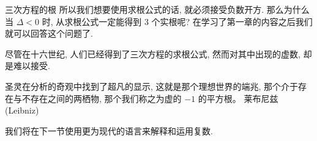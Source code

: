 \begin{frame}{三次方程的根\noexer}
	\onslide<+->
	所以我们想要使用求根公式的话, 就\alert{必须接受负数开方}.
	\onslide<+->
	那么为什么当 $\Delta<0$ 时, 从求根公式一定能得到 $3$ 个实根呢?
	\onslide<+->
	在学习了第一章的内容之后我们就可以回答这个问题了.

	\onslide<+->
	尽管在十六世纪, 人们已经得到了三次方程的求根公式, 然而对其中出现的虚数, 却是难以接受.

	\onslide<+->
	\begin{tcolorbox}[
		common,
		borderline={0pt}{0pt}{fourth,cstdash},
		colbacktitle=fourth,
		fontlower=\itshape,
		halign lower=flush right,
		lower separated=true]
		圣灵在分析的奇观中找到了超凡的显示, 这就是那个理想世界的端兆, 那个介于存在与不存在之间的两栖物, 那个我们称之为虚的 $-1$ 的平方根。
		\tcblower
		莱布尼兹 (Leibniz)
	\end{tcolorbox}

	\onslide<+->
	我们将在下一节使用更为现代的语言来解释和运用复数.
\end{frame}

